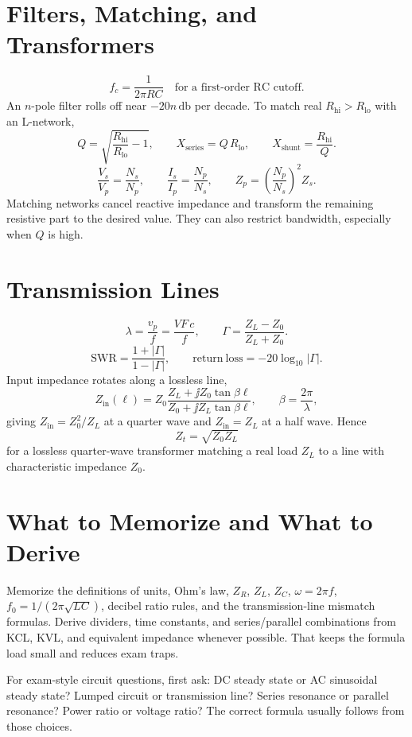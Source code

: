 \section{Filters, Matching, and Transformers}
\[
f_c=\frac{1}{2\pi RC}\quad \text{for a first-order RC cutoff.}
\]
An \(n\)-pole filter rolls off near \(-20n\,\si{\decibel}\) per decade. To match
real \(R_{\text{hi}}>R_{\text{lo}}\) with an L-network,
\[
Q=\sqrt{\frac{R_{\text{hi}}}{R_{\text{lo}}}-1},
\qquad
X_{\text{series}}=Q\,R_{\text{lo}},
\qquad
X_{\text{shunt}}=\frac{R_{\text{hi}}}{Q}.
\]
\[
\frac{V_s}{V_p}=\frac{N_s}{N_p},
\qquad
\frac{I_s}{I_p}=\frac{N_p}{N_s},
\qquad
Z_p=\left(\frac{N_p}{N_s}\right)^2 Z_s.
\]
Matching networks cancel reactive impedance and transform the remaining
resistive part to the desired value. They can also restrict bandwidth, especially
when \(Q\) is high.

\section{Transmission Lines}
\[
\lambda=\frac{v_p}{f}=\frac{VF\,c}{f},
\qquad
\Gamma=\frac{Z_L-Z_0}{Z_L+Z_0}.
\]
\[
\mathrm{SWR}=\frac{1+|\Gamma|}{1-|\Gamma|},
\qquad
\mathrm{return\ loss}=-20\log_{10}|\Gamma|.
\]
Input impedance rotates along a lossless line,
\[
Z_{\mathrm{in}}(\ell)=Z_0\frac{Z_L+\jj Z_0\tan\beta\ell}{Z_0+\jj Z_L\tan\beta\ell},
\qquad
\beta=\frac{2\pi}{\lambda},
\]
giving \(Z_{\mathrm{in}}=Z_0^2/Z_L\) at a quarter wave and \(Z_{\mathrm{in}}=Z_L\)
at a half wave. Hence
\[
Z_t=\sqrt{Z_0Z_L}
\]
for a lossless quarter-wave transformer matching a real load \(Z_L\) to a line
with characteristic impedance \(Z_0\).

\section{What to Memorize and What to Derive}
Memorize the definitions of units, Ohm's law, \(Z_R\), \(Z_L\), \(Z_C\),
\(\omega=2\pi f\), \(f_0=1/(2\pi\sqrt{LC})\), decibel ratio rules, and the
transmission-line mismatch formulas. Derive dividers, time constants, and
series/parallel combinations from KCL, KVL, and equivalent impedance whenever
possible. That keeps the formula load small and reduces exam traps.

\begin{exambox}
For exam-style circuit questions, first ask: DC steady state or AC sinusoidal
steady state? Lumped circuit or transmission line? Series resonance or parallel
resonance? Power ratio or voltage ratio? The correct formula usually follows
from those choices.
\end{exambox}
